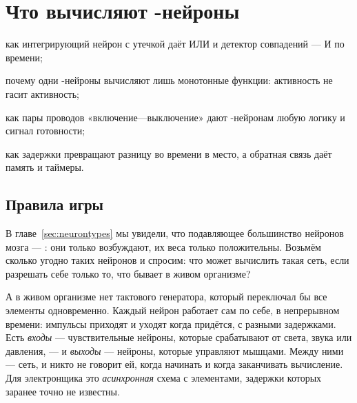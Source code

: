 \chapter{Что вычисляют -нейроны}
\label{sec:glutcomputer}
\begin{chaptergoals}
\item как интегрирующий нейрон с утечкой даёт ИЛИ и детектор совпадений --- И по времени;
\item почему одни -нейроны вычисляют лишь монотонные функции: активность не гасит активность;
\item как пары проводов «включение---выключение» дают -нейронам любую логику и сигнал готовности;
\item как задержки превращают разницу во времени в место, а обратная связь даёт память и таймеры.
\end{chaptergoals}

\section{Правила игры}

В главе~\ref{sec:neurontypes} мы увидели, что подавляющее большинство нейронов мозга --- : они только возбуждают, их веса только положительны. Возьмём сколько угодно таких нейронов и спросим: что может вычислить такая сеть, если разрешать себе только то, что бывает в живом организме?

А в живом организме нет тактового генератора, который переключал бы все элементы одновременно. Каждый нейрон работает сам по себе, в непрерывном времени: импульсы приходят и уходят когда придётся, с разными задержками. Есть \emph{входы} --- чувствительные нейроны, которые срабатывают от света, звука или давления, --- и \emph{выходы} --- нейроны, которые управляют мышцами. Между ними --- сеть, и никто не говорит ей, когда начинать и когда заканчивать вычисление. Для электронщика это \emph{асинхронная} схема с элементами, задержки которых заранее точно не известны.

